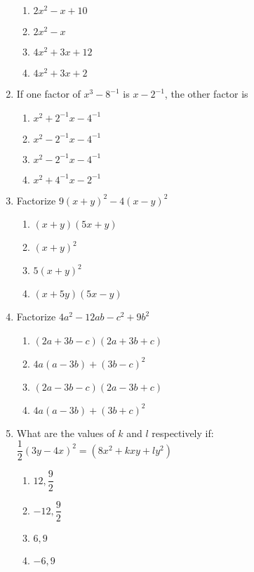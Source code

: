 \begin{multicols}{2}
\begin{enumerate}[label={\arabic*.}]
      \begin{enumerate}[label={\Alph*.}]
        \item \(2{x}^{2} - x + 10\)
        \item \(2{x}^{2} - x\)
        \item \(4{x}^{2} + 3x + 12\)
        \item \(4{x}^{2} + 3x + 2\)
      \end{enumerate}
    \item If one factor of \({x}^{3}-8^{-1}\) is \(x-2^{-1}\), the other factor is
      \begin{enumerate}[label={\Alph*.}]
        \item \({x}^{2}+2^{-1}x-4^{-1}\)
        \item \({x}^{2}-2^{-1}x-4^{-1}\)
        \item \({x}^{2}-2^{-1}x-4^{-1}\)
        \item \({x}^{2}+4^{-1}x-2^{-1}\)
      \end{enumerate}
    \item Factorize \(9{(x+y)}^2 - 4{(x-y)}^2\)
      \begin{enumerate}[label={\Alph*.}]
        \item \((x+y)(5x+y)\)
        \item \({(x+y)}^2\)
        \item \({5(x+y)}^2\)
        \item \((x+5y)(5x-y)\)
      \end{enumerate}
    \item Factorize \(4a^2-12ab-c^2+9b^2\)
      \begin{enumerate}[label={\Alph*.}]
        \item \((2a+3b-c)(2a+3b+c)\)
        \item \(4a(a-3b)+(3b-c)^2\)
        \item \((2a-3b-c)(2a-3b+c)\)
        \item \(4a(a-3b) + (3b+c)^2\)
      \end{enumerate}
    \item What are the values of \(k\) and \(l\) respectively if: \(\dfrac{1}{2}{(3y-4x)}^2 = (8{x}^{2}+kxy+ly^2)\)
      \begin{enumerate}[label={\Alph*.}]
        \item \(12, \dfrac{9}{2}\)
        \item \(-12, \dfrac{9}{2}\)
        \item \(6, 9\)
        \item \(-6, 9\)
      \end{enumerate}

\end{enumerate}
\end{multicols}
